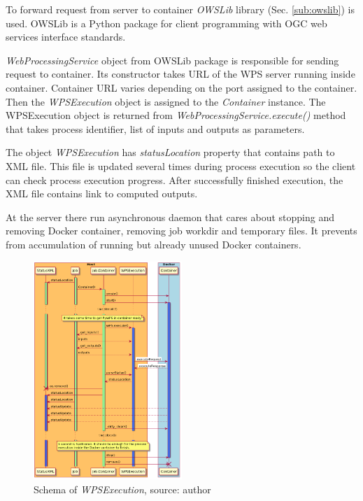 \documentclass{gifce}
\begin{document}
To forward request from server to container \textit{OWSLib}
library (Sec. \ref{sub:owslib}) is used. OWSLib is a Python package for client programming with OGC web services 
interface standards.

\textit{WebProcessingService} object from OWSLib package is responsible for sending request to container. Its constructor takes URL of the
WPS server running inside container. Container URL varies depending on the port assigned to the container. Then the \textit{WPSExecution}
object is assigned to the \textit{Container} instance. The WPS\-Execution object is returned from \textit{WebProcessingService.execute()} 
method that takes process identifier, list of inputs and outputs as parameters.

The object \textit{WPSExecution} has \textit{statusLocation} property that contains path to XML file.
This file is updated several times during process execution so the client can check process execution progress.
After successfully finished execution, the XML file contains link to computed outputs.

At the server there run asynchronous daemon that cares about stopping and removing Docker container, removing
job workdir and temporary files. It prevents from accumulation of running but already unused Docker containers.


\begin{figure}[h!]
\centering
\includegraphics[width=0.5\textwidth]{img/Diag_WPSExecute.png}
\caption{Schema of \textit{WPSExecution}, source: author}
\label{fig:DiagWPSExecute}
\end{figure}
\end{document}
